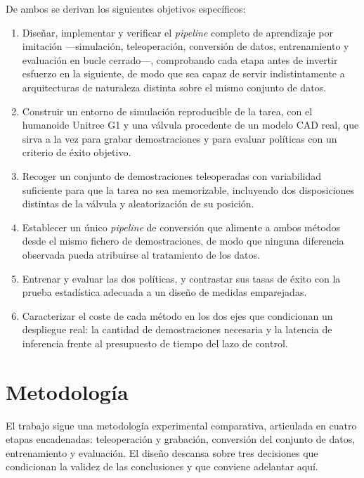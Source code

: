 De ambos se derivan los siguientes objetivos específicos:

\begin{enumerate}

	\item Diseñar, implementar y verificar el \textit{pipeline} completo de aprendizaje por
	imitación —simulación, teleoperación, conversión de datos, entrenamiento y evaluación en bucle
	cerrado—, comprobando cada etapa antes de invertir esfuerzo en la siguiente, de modo que sea
	capaz de servir indistintamente a arquitecturas de naturaleza distinta sobre el mismo conjunto
	de datos.

	\item Construir un entorno de simulación reproducible de la tarea, con el humanoide Unitree G1
	y una válvula procedente de un modelo CAD real, que sirva a la vez para grabar demostraciones y
	para evaluar políticas con un criterio de éxito objetivo.

	\item Recoger un conjunto de demostraciones teleoperadas con variabilidad suficiente para que
	la tarea no sea memorizable, incluyendo dos disposiciones distintas de la válvula y
	aleatorización de su posición.

	\item Establecer un único \textit{pipeline} de conversión que alimente a ambos métodos desde el mismo
	fichero de demostraciones, de modo que ninguna diferencia observada pueda atribuirse al
	tratamiento de los datos.

	\item Entrenar y evaluar las dos políticas, y contrastar sus tasas de éxito con la prueba
	estadística adecuada a un diseño de medidas emparejadas.

	\item Caracterizar el coste de cada método en los dos ejes que condicionan un despliegue real:
	la cantidad de demostraciones necesaria y la latencia de inferencia frente al presupuesto de
	tiempo del lazo de control.

\end{enumerate}


\section*{Metodología}

El trabajo sigue una metodología experimental comparativa, articulada en cuatro etapas encadenadas:
teleoperación y grabación, conversión del conjunto de datos, entrenamiento y evaluación. El diseño
descansa sobre tres decisiones que condicionan la validez de las conclusiones y que conviene
adelantar aquí.

